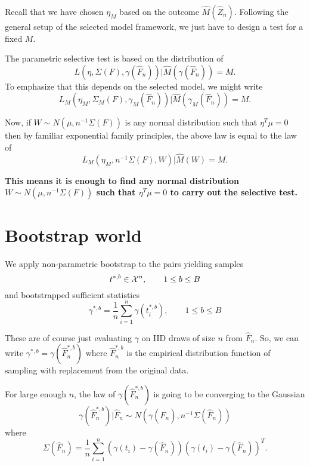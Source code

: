 \documentclass{article}
\begin{document}
Recall that we have chosen $\eta_M$ based on the outcome $\hat{M}(\hat{Z}_n)$. Following the general setup of the
selected model framework, we just have to design
a test for a fixed $M$.

The parametric selective test is based on the distribution of 
$$
L(\eta, \Sigma(F), \gamma(\hat{F}_n)) \big \vert \hat{M}(\gamma(\hat{F}_n)) = M.
$$
To emphasize that this depends on the selected model, we might write
$$
L_M(\eta_M, \Sigma_M(F), \gamma_M(\hat{F}_n)) \big \vert \hat{M}(\gamma_M(\hat{F}_n)) = M.
$$

Now, if $W \sim N(\mu, n^{-1}\Sigma(F))$ is any normal distribution
such that $\eta^T\mu=0$ then by familiar exponential family principles, the above law
is equal to the law of
$$
L_M(\eta_M, n^{-1}\Sigma(F), W) \big \vert \hat{M}(W) = M.
$$

{\bf This means it is enough to find any normal distribution
$W \sim N(\mu, n^{-1}\Sigma(F))$ such that $\eta^T\mu=0$ to carry out the
selective test.
}

\section{Bootstrap world}

We apply non-parametric bootstrap to the pairs 
yielding samples
$$
t^{*,b} \in {\cal X}^n, \qquad 1 \leq  b \leq B
$$
and  bootstrapped sufficient statistics
$$
\gamma^{*,b} = \frac{1}{n} \sum_{i=1}^n \gamma(t_i^{*,b}),  \qquad 1 \leq  b \leq B
$$

These are of course just evaluating $\gamma$ on 
IID draws of size $n$ from $\hat{F}_n$. So,
we can write
$\gamma^{*,b} = \gamma(\hat{F}_n^{*,b})$
where $\hat{F}_n^{*,b}$ is the empirical
distribution function of sampling with replacement from the original data.

For large enough $n$, the law of $\gamma(\hat{F}_n^{*,b})$ is going to be converging
to the Gaussian 
$$
\gamma(\hat{F}_n^{*,b}) | \hat{F}_n \sim N(\gamma(\hat{F}_n), n^{-1} \Sigma(\hat{F}_n))
$$
where
$$
\Sigma(\hat{F}_n) = \frac{1}{n} \sum_{i=1}^n \left(\gamma(t_i) - \gamma(\hat{F}_n) \right)\left(\gamma(t_i) - \gamma(\hat{F}_n) \right)^T.
$$
\end{document}
